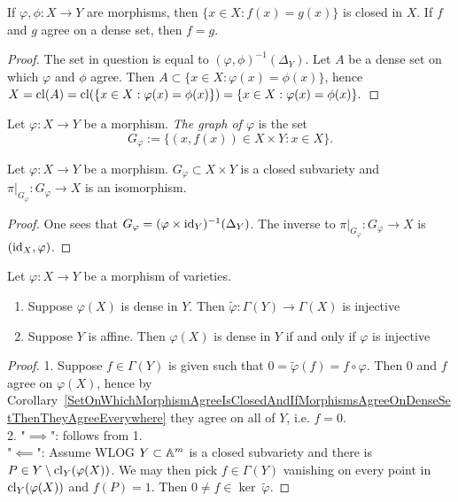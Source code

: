         \begin{corollary}\label{SetOnWhichMorphismAgreeIsClosedAndIfMorphismsAgreeOnDenseSetThenTheyAgreeEverywhere}
            If $\varphi,\phi: X\rightarrow Y $ are morphisms, then $\{ x\in X: f(x)=g(x)\}$ is closed in $X$. If $f$ and $g$ agree on a dense set, then $f=g$.
        \end{corollary}
        \begin{proof}
            The set in question is equal to $(\varphi,\phi)^{-1}(\Delta_Y)$. Let $A$ be a dense set on which $\varphi$ and $\phi$ agree. Then $A\subset \{x\in X: \varphi(x)=\phi(x)\}$, hence $X=\mathrm{cl}(A)=\mathrm{cl}(\{x\in X: \varphi(x)=\phi(x)\})=\{x\in X: \varphi(x)=\phi(x)\}.$
        \end{proof}
        \begin{definition}
            Let $\varphi: X\rightarrow Y$ be a morphism. \textit{The graph of $\varphi$} is the set 
            $$G_\varphi :=\{(x,f(x))\in X\times Y: x\in X\}.$$
        \end{definition}
        \begin{proposition}\label{GraphIsAClosedSubvariety}
            Let $\varphi : X\rightarrow Y$ be a morphism. $G_\varphi\subset X\times Y$ is a closed subvariety and $\left.\pi\right|_{G_\varphi}: G_\varphi\rightarrow X$ is an isomorphism. 
        \end{proposition}
        \begin{proof}
            One sees that $G_\varphi = (\varphi\times \mathrm{id}_Y)^{-1}(\Delta_Y)$. The inverse to $\left.\pi\right|_{G_\varphi}: G_\varphi\rightarrow X$ is $(\mathrm{id}_X,\varphi)$.
        \end{proof}
        \begin{lemma}\label{ImageDenseIffInducedMapInjective}
            Let $\varphi:X\rightarrow Y$ be a morphism of varieties. 
            \begin{enumerate}
                \item Suppose $\varphi(X)$ is dense in $Y$. Then $\widetilde{\varphi}: \Gamma(Y)\rightarrow\Gamma(X)$ is injective
                \item Suppose $Y$ is affine. Then $\varphi(X)$ is dense in $Y$ if and only if $\varphi$ is injective
            \end{enumerate}
        \end{lemma}
        \begin{proof}
            1. Suppose $f\in \Gamma(Y)$ is given such that $0=\widetilde{\varphi}(f)= f\circ\varphi$. Then $0$ and $f$ agree on $\varphi(X)$, hence by Corollary~\ref{SetOnWhichMorphismAgreeIsClosedAndIfMorphismsAgreeOnDenseSetThenTheyAgreeEverywhere} they agree on all of $Y$, i.e. $f=0$.\\
            2. "$\implies$": follows from 1.\\
            "$\impliedby$": Assume WLOG $Y\subset \mathbb{A}^m$ is a closed subvariety and there is $P\in Y\setminus \mathrm{cl}_Y(\varphi(X))$. We may then pick $f\in \Gamma(Y)$ vanishing on every point in $\mathrm{cl}_Y(\varphi(X))$ and $f(P)=1$. Then $0\neq f\in \ker \ \widetilde{\varphi}$.
        \end{proof}
